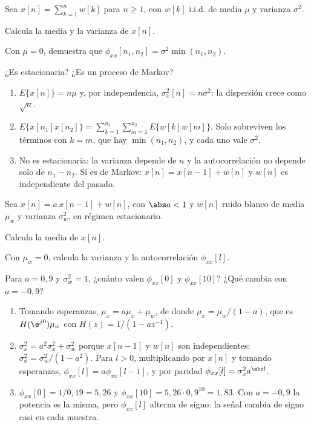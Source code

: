 \documentclass[11pt,a4paper]{scrartcl}
\begin{document}
\begin{ejercicio}
  Sea $x[n]=\sum_{k=1}^nw[k]$ para $n\ge1$, con $w[k]$ i.i.d. de media $\mu$ y varianza $\sigma^2$.
  \begin{incisos}[1]
    \item Calcula la media y la varianza de $x[n]$.
    \item Con $\mu=0$, demuestra que $\phi_{xx}[n_1,n_2]=\sigma^2\min(n_1,n_2)$.
    \item ¿Es estacionaria? ¿Es un proceso de Markov?
  \end{incisos}
\end{ejercicio}
\begin{solucion}
  \begin{enumerate}[label=\alph*)]
    \item $E\{x[n]\}=n\mu$ y, por independencia, $\sigma_x^2[n]=n\sigma^2$: la dispersión crece como $\sqrt n$.
    \item $E\{x[n_1]x[n_2]\}=\sum_{k=1}^{n_1}\sum_{m=1}^{n_2}E\{w[k]w[m]\}$. Solo sobreviven los términos con $k=m$, que hay $\min(n_1,n_2)$, y cada uno vale $\sigma^2$.
    \item No es estacionaria: la varianza depende de $n$ y la autocorrelación no depende solo de $n_1-n_2$. Sí es de Markov: $x[n]=x[n-1]+w[n]$ y $w[n]$ es independiente del pasado.
  \end{enumerate}
\end{solucion}

\begin{ejercicio}[proceso AR(1)]
  Sea $x[n]=a\,x[n-1]+w[n]$, con $\abs a<1$ y $w[n]$ ruido blanco de media $\mu_w$ y varianza $\sigma_w^2$, en régimen estacionario.
  \begin{incisos}[1]
    \item Calcula la media de $x[n]$.
    \item Con $\mu_w=0$, calcula la varianza y la autocorrelación $\phi_{xx}[l]$.
    \item Para $a=0{,}9$ y $\sigma_w^2=1$, ¿cuánto valen $\phi_{xx}[0]$ y $\phi_{xx}[10]$? ¿Qué cambia con $a=-0{,}9$?
  \end{incisos}
\end{ejercicio}
\begin{solucion}
  \begin{enumerate}[label=\alph*)]
    \item Tomando esperanzas, $\mu_x=a\mu_x+\mu_w$, de donde $\mu_x=\mu_w/(1-a)$, que es $H(\e^{j0})\mu_w$ con $H(z)=1/(1-az^{-1})$.
    \item $\sigma_x^2=a^2\sigma_x^2+\sigma_w^2$ porque $x[n-1]$ y $w[n]$ son independientes: $\sigma_x^2=\sigma_w^2/(1-a^2)$. Para $l>0$, multiplicando por $x[n]$ y tomando esperanzas, $\phi_{xx}[l]=a\phi_{xx}[l-1]$, y por paridad $\phi_{xx}[l]=\sigma_x^2a^{\abs l}$.
    \item $\phi_{xx}[0]=1/0{,}19=5{,}26$ y $\phi_{xx}[10]=5{,}26\cdot0{,}9^{10}=1{,}83$. Con $a=-0{,}9$ la potencia es la misma, pero $\phi_{xx}[l]$ alterna de signo: la señal cambia de signo casi en cada muestra.
  \end{enumerate}
\end{solucion}
\end{document}

